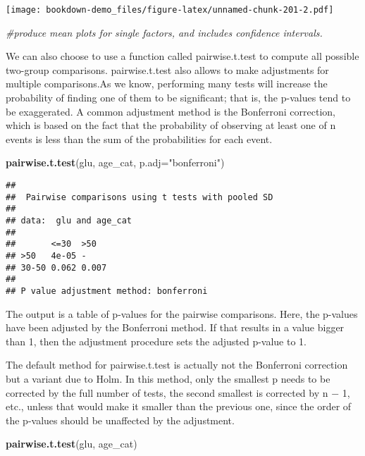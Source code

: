 \documentclass[]{book}
\newenvironment{Shaded}{\begin{snugshade}}{\end{snugshade}}
\newcommand{\KeywordTok}[1]{\textcolor[rgb]{0.13,0.29,0.53}{\textbf{#1}}}
\newcommand{\DataTypeTok}[1]{\textcolor[rgb]{0.13,0.29,0.53}{#1}}
\newcommand{\StringTok}[1]{\textcolor[rgb]{0.31,0.60,0.02}{#1}}
\newcommand{\CommentTok}[1]{\textcolor[rgb]{0.56,0.35,0.01}{\textit{#1}}}
\newcommand{\NormalTok}[1]{#1}
\theoremstyle{definition}
\theoremstyle{definition}
\theoremstyle{definition}
\theoremstyle{remark}
\begin{document}
\texttt{[image: bookdown-demo\_files/figure-latex/unnamed-chunk-201-2.pdf]}

\begin{Shaded}
\begin{Highlighting}[]
\CommentTok{#produce mean plots for single factors, and includes confidence intervals.}
\end{Highlighting}
\end{Shaded}

We can also choose to use a function called pairwise.t.test to compute
all possible two-group comparisons. pairwise.t.test also allows to make
adjustments for multiple comparisons.As we know, performing many tests
will increase the probability of finding one of them to be significant;
that is, the p-values tend to be exaggerated. A common adjustment method
is the Bonferroni correction, which is based on the fact that the
probability of observing at least one of n events is less than the sum
of the probabilities for each event.

\begin{Shaded}
\begin{Highlighting}[]
\KeywordTok{pairwise.t.test}\NormalTok{(glu, age_cat, }\DataTypeTok{p.adj=}\StringTok{"bonferroni"}\NormalTok{)}
\end{Highlighting}
\end{Shaded}

\begin{verbatim}
## 
##  Pairwise comparisons using t tests with pooled SD 
## 
## data:  glu and age_cat 
## 
##       <=30  >50  
## >50   4e-05 -    
## 30-50 0.062 0.007
## 
## P value adjustment method: bonferroni
\end{verbatim}

The output is a table of p-values for the pairwise comparisons. Here,
the p-values have been adjusted by the Bonferroni method. If that
results in a value bigger than 1, then the adjustment procedure sets the
adjusted p-value to 1.

The default method for pairwise.t.test is actually not the Bonferroni
correction but a variant due to Holm. In this method, only the smallest
p needs to be corrected by the full number of tests, the second smallest
is corrected by n − 1, etc., unless that would make it smaller than the
previous one, since the order of the p-values should be unaffected by
the adjustment.

\begin{Shaded}
\begin{Highlighting}[]
\KeywordTok{pairwise.t.test}\NormalTok{(glu, age_cat)}
\end{Highlighting}
\end{Shaded}
\end{document}
